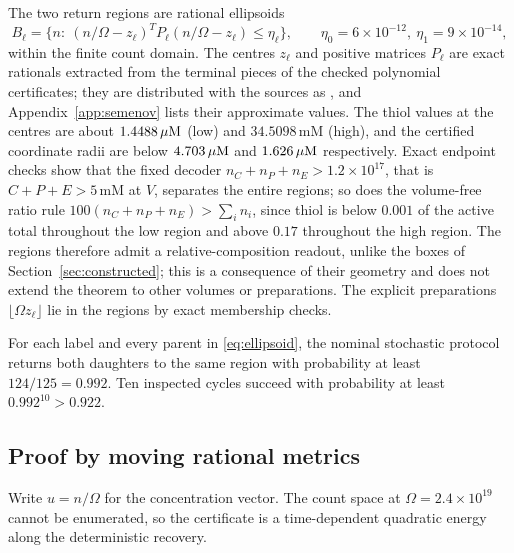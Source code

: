 The two return regions are rational ellipsoids
\begin{equation}\label{eq:ellipsoid}
 B_\ell=\bigl\{n:\ (n/\Omega-z_\ell)^TP_\ell(n/\Omega-z_\ell)\le\eta_\ell\bigr\},\qquad \eta_0=6\times10^{-12},\ \eta_1=9\times10^{-14},
\end{equation}
within the finite count domain. The centres $z_\ell$ and positive matrices $P_\ell$ are exact rationals extracted from the terminal pieces of the checked polynomial certificates; they are distributed with the sources as , and Appendix~\ref{app:semenov} lists their approximate values. The thiol values at the centres are about $1.4488\,\mu\mathrm{M}$ (low) and $34.5098$\,mM (high), and the certified coordinate radii are below $4.703\,\mu\mathrm{M}$ and $1.626\,\mu\mathrm{M}$ respectively. Exact endpoint checks show that the fixed decoder $n_C+n_P+n_E>1.2\times10^{17}$, that is $C+P+E>5$\,mM at $V$, separates the entire regions; so does the volume-free ratio rule $100(n_C+n_P+n_E)>\sum_in_i$, since thiol is below $0.001$ of the active total throughout the low region and above $0.17$ throughout the high region. The regions therefore admit a relative-composition readout, unlike the boxes of Section~\ref{sec:constructed}; this is a consequence of their geometry and does not extend the theorem to other volumes or preparations. The explicit preparations $\lfloor\Omega z_\ell\rfloor$ lie in the regions by exact membership checks.

\begin{theorem}\label{thm:semenov}
For each label and every parent in \eqref{eq:ellipsoid}, the nominal stochastic protocol returns both daughters to the same region with probability at least $124/125=0.992$. Ten inspected cycles succeed with probability at least $0.992^{10}>0.922$.
\end{theorem}

\subsection{Proof by moving rational metrics}\label{sec:semproof}
Write $u=n/\Omega$ for the concentration vector. The count space at $\Omega=2.4\times10^{19}$ cannot be enumerated, so the certificate is a time-dependent quadratic energy along the deterministic recovery.

